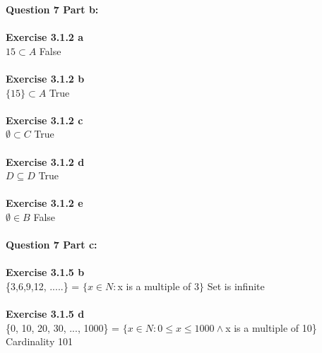 \documentclass[11pt]{article}
\begin{document}
\noindent \textbf{Question 7 Part b:}\\\\
\textbf{Exercise 3.1.2 a }\\	
$15 \subset A$ False\\\\
\textbf{Exercise 3.1.2 b }\\
$\{15\} \subset A$ True\\\\	
\textbf{Exercise 3.1.2 c }\\	
$\emptyset \subset C$ True\\\\
\textbf{Exercise 3.1.2 d }\\	
$D \subseteq D$ True\\\\
\textbf{Exercise 3.1.2 e }\\
$\emptyset \in B$ False\\\\
\noindent \textbf{Question 7 Part c:}\\\\
\textbf{Exercise 3.1.5 b }\\
\{3,6,9,12, .....\} = $\{ x \in N: $x is a multiple of 3$\}$ Set is infinite\\\\
\textbf{Exercise 3.1.5 d }\\
\{0, 10, 20, 30, ..., 1000\} = $\{x \in N: 0 \leq x \leq 1000 \wedge $x is a multiple of 10\} \\Cardinality 101\\

\newpage
\end{document}

